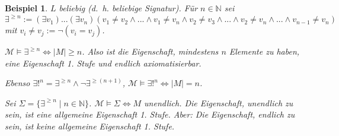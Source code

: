\documentclass{article}
\theoremstyle{definition}
\theoremstyle{plain}
\newtheorem*{bsp}{Beispiel}
\newcommand{\calM}{\mathcal{M}}
\begin{document}
    \begin{bsp}
        $ L $ beliebig (d.~h. beliebige Signatur).
        Für $ n \in \mathbb{N} $ sei
        \begin{equation*}
            \exists^{\geq n} := (\exists v_1) ... (\exists v_n) (v_1 \not = v_2 \land ... \land v_1 \not = v_n \land v_2 \not = v_3 \land ... \land v_2 \not = v_n \land ... \land v_{n-1} \not = v_n)
        \end{equation*}
        mit $ v_i \not = v_j := \neg (v_i = v_j) $.

        $ \calM \models \exists^{\geq n} \Leftrightarrow | M | \geq n $.
        Also ist die Eigenschaft, mindestens $ n $ Elemente zu haben, eine Eigenschaft 1. Stufe und endlich axiomatisierbar.

        Ebenso $ \exists!^n = \exists^{\geq n} \land \neg \exists^{\geq(n+1)} $, $ \calM \models \exists!^n \Leftrightarrow |M| = n $.

        Sei $ \Sigma = \{ \exists^{\geq n} \mid n \in \mathbb{N} \} $.
        $ \calM \models \Sigma \Leftrightarrow M $ unendlich.
        Die Eigenschaft, unendlich zu sein, ist eine allgemeine Eigenschaft 1. Stufe.
        Aber: Die Eigenschaft, endlich zu sein, ist keine allgemeine Eigenschaft 1. Stufe.
    \end{bsp}
\end{document}
